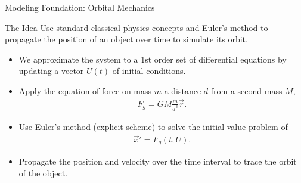 \documentclass{beamer}
\begin{document}
\begin{frame}{Modeling Foundation: Orbital Mechanics}
 \begin{block}{The Idea}
 Use standard classical physics concepts and Euler's method to propagate the position of an object over time to simulate its orbit.
\end{block}
\small{
\begin{itemize}
 \item{We approximate the system to a 1st order set of differential equations by updating a vector \(U(t)\) of initial conditions.}

\item{Apply the equation of force on mass \(m\) a distance \(d\) from a second mass \(M\), 
\begin{align}
F_{g} = GM \frac{m}{d^3} \vec{r}.
\end{align} }
\item{Use Euler's method (explicit scheme) to solve the initial value problem of
\begin{align}
\vec{x}' = F_{g}(t,U).
\end{align} }
\item{Propagate the position and velocity over the time interval to trace the orbit of the object.}
\end{itemize}

}

\end{frame}

\end{document}
